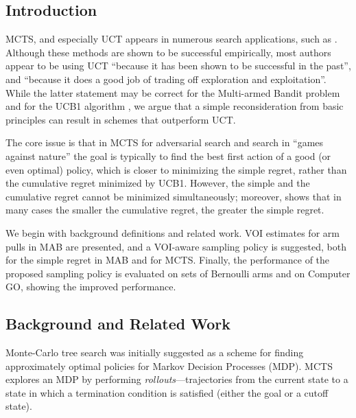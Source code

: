 \subsection{Introduction}

MCTS, and especially UCT \cite{Kocsis.uct} appears in numerous search
applications, such as \cite{Eyerich.ctp}. Although these methods are
shown to be successful empirically, most authors appear to be using
UCT ``because it has been shown to be successful in the past'', and
``because it does a good job of trading off exploration and
exploitation''. While the latter statement may be correct for the
Multi-armed Bandit problem and for the UCB1 algorithm \cite{Auer.ucb},
we argue that a simple reconsideration from basic principles can
result in schemes that outperform UCT.

The core issue is that in MCTS for adversarial search and search in
``games against nature'' the goal is typically to find the best
first action of a good (or even optimal) policy, which is closer to
minimizing the simple regret, rather than the cumulative regret
minimized by UCB1.  However, the simple and the cumulative regret
cannot be minimized simultaneously; moreover, \cite{Bubeck.pure} shows
that in many cases the smaller the cumulative regret, the greater the
simple regret.

We begin with background definitions and related work.  VOI estimates
for arm pulls in MAB are presented, and a VOI-aware sampling policy is
suggested, both for the simple regret in MAB and for MCTS.  Finally,
the performance of the proposed sampling policy is evaluated on sets
of Bernoulli arms and on Computer GO, showing the improved
performance.

\subsection{Background and Related Work}
\label{sec:mcts-related-work}

Monte-Carlo tree search was initially suggested as a scheme for
finding approximately optimal policies for Markov Decision Processes
(MDP).  MCTS explores an MDP by performing
\emph{rollouts}---trajectories from the current state to a state in
which a termination condition is satisfied (either the goal or a
cutoff state).


